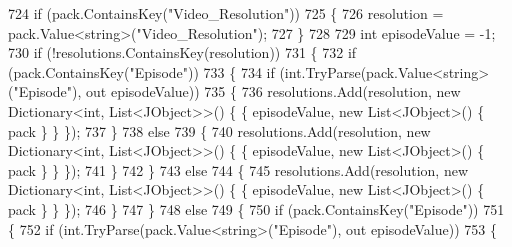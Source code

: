 \begin{DoxyCode}
724                             \textcolor{keywordflow}{if} (pack.ContainsKey(\textcolor{stringliteral}{"Video\_Resolution"}))
725                             \{
726                                 resolution = pack.Value<\textcolor{keywordtype}{string}>(\textcolor{stringliteral}{"Video\_Resolution"});
727                             \}
728 
729                             \textcolor{keywordtype}{int} episodeValue = -1;
730                             \textcolor{keywordflow}{if} (!resolutions.ContainsKey(resolution))
731                             \{
732                                 \textcolor{keywordflow}{if} (pack.ContainsKey(\textcolor{stringliteral}{"Episode"}))
733                                 \{
734                                     \textcolor{keywordflow}{if} (\textcolor{keywordtype}{int}.TryParse(pack.Value<\textcolor{keywordtype}{string}>(\textcolor{stringliteral}{"Episode"}), out episodeValue))
735                                     \{
736                                         resolutions.Add(resolution, \textcolor{keyword}{new} Dictionary<\textcolor{keywordtype}{int}, List<JObject>>() \{ 
      \{ episodeValue, \textcolor{keyword}{new} List<JObject>() \{ pack \} \} \});
737                                     \}
738                                     \textcolor{keywordflow}{else}
739                                     \{
740                                         resolutions.Add(resolution, \textcolor{keyword}{new} Dictionary<\textcolor{keywordtype}{int}, List<JObject>>() \{ 
      \{ episodeValue, \textcolor{keyword}{new} List<JObject>() \{ pack \} \} \});
741                                     \}
742                                 \}
743                                 \textcolor{keywordflow}{else}
744                                 \{
745                                     resolutions.Add(resolution, \textcolor{keyword}{new} Dictionary<\textcolor{keywordtype}{int}, List<JObject>>() \{ \{ 
      episodeValue, \textcolor{keyword}{new} List<JObject>() \{ pack \} \} \});
746                                 \}
747                             \}
748                             \textcolor{keywordflow}{else}
749                             \{
750                                 \textcolor{keywordflow}{if} (pack.ContainsKey(\textcolor{stringliteral}{"Episode"}))
751                                 \{
752                                     \textcolor{keywordflow}{if} (\textcolor{keywordtype}{int}.TryParse(pack.Value<\textcolor{keywordtype}{string}>(\textcolor{stringliteral}{"Episode"}), out episodeValue))
753                                     \{

\end{DoxyCode}
